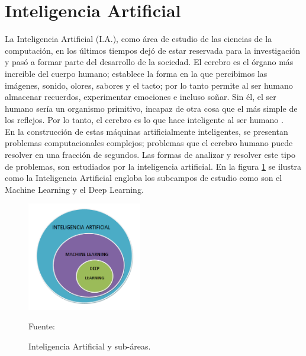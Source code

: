 \section{Inteligencia Artificial}
La Inteligencia Artificial (I.A.), como área de estudio de las ciencias de la computación, en los últimos tiempos dejó de estar reservada para la investigación y pasó a formar parte del desarrollo de la sociedad. El cerebro es el órgano más increible del cuerpo humano; establece la forma en la que percibimos las imágenes, sonido, olores, sabores y el tacto; por lo tanto permite al ser humano almacenar recuerdos, experimentar emociones e incluso soñar. Sin él, el ser humano sería un organismo primitivo, incapaz de otra cosa que el más simple de los reflejos. Por lo tanto, el cerebro es lo que hace inteligente al ser humano \cite{intro_ia}.\\

En la construcción de estas máquinas artificialmente inteligentes, se presentan problemas computacionales complejos; problemas que el cerebro humano puede resolver en una fracción de segundos. Las formas de analizar y resolver este tipo de problemas, son estudiados por la inteligencia artificial. En la figura \ref{fig:ia} se ilustra como la Inteligencia Artificial engloba los subcampos de estudio como son el Machine Learning y el Deep Learning.\\

\begin{figure}[H]
    \begin{center}
        \includegraphics[width=5cm]{img/capitulo_2/ia.png}
    \end{center}
    \begin{center}
        \caption{Inteligencia Artificial y sub-áreas.}
        Fuente: \cite{ia}
        \label{fig:ia}
    \end{center}
\end{figure}

